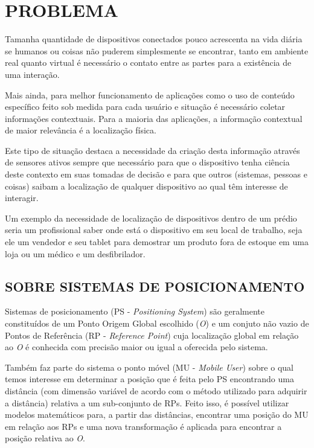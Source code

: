 \chapter{PROBLEMA}
\label{chap:PROBLEMA}

Tamanha quantidade de dispositivos conectados pouco acrescenta na vida diária se
humanos ou coisas não puderem simplesmente se encontrar, tanto em ambiente real
quanto virtual é necessário o contato entre as partes para a existência de uma
interação.

Mais ainda, para melhor funcionamento de aplicações como o uso de conteúdo
específico feito sob medida para cada usuário e situação é necessário coletar
informações contextuais. Para a maioria das aplicações, a informação contextual
de maior relevância é a localização física.

Este tipo de situação destaca a necessidade da criação desta informação através
de sensores ativos sempre que necessário para que o dispositivo tenha ciência
deste contexto em suas tomadas de decisão e para que outros (sistemas, pessoas e
coisas) saibam a localização de qualquer dispositivo ao qual têm interesse de
interagir.

Um exemplo da necessidade de localização de dispositivos dentro de um prédio
seria um profissional saber onde está o dispositivo em seu local de trabalho,
seja ele um vendedor e seu tablet para demostrar um produto fora de estoque em
uma loja ou um médico e um desfibrilador.

\section{SOBRE SISTEMAS DE POSICIONAMENTO}
\label{sec:SOBRE SISTEMAS DE POSICIONAMENTO}

Sistemas de posicionamento (PS - \textit{Positioning System}) são geralmente
constituídos de um Ponto Origem Global escolhido (\textit{O}) e um conjuto não
vazio de Pontos de Referência (RP - \textit{Reference Point}) cuja localização
global em relação ao \textit{O} é conhecida com precisão maior ou igual a
oferecida pelo sistema.

Também faz parte do sistema o ponto móvel (MU - \textit{Mobile User}) sobre o
qual temos interesse em determinar a posição que é feita pelo PS encontrando uma
distância (com dimensão variável de acordo com o método utilizado para adquirir
a distância) relativa a um sub-conjunto de RPs. Feito isso, é possível utilizar
modelos matemáticos para, a partir das distâncias, encontrar uma posição do MU
em relação aos RPs e uma nova transformação é aplicada para encontrar a posição
relativa ao \textit{O}.

